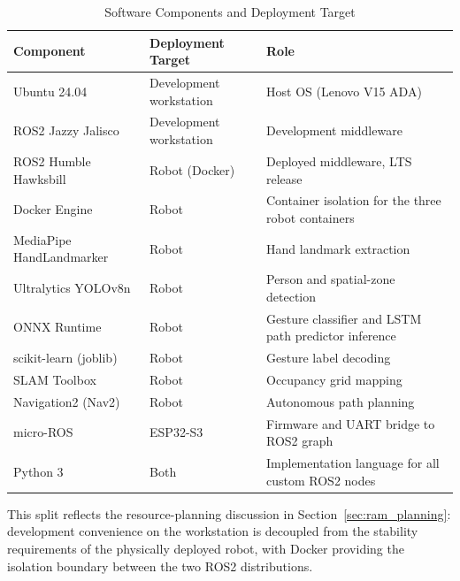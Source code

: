 \begin{table}[H]
\centering
\caption{Software Components and Deployment Target}
\label{tab:software_requirements}

\renewcommand{\arraystretch}{1.2}

\begin{tabular}{|p{3.2cm}|p{3cm}|p{7cm}|}
\hline
\textbf{Component} & \textbf{Deployment Target} & \textbf{Role} \\
\hline

Ubuntu 24.04 & Development workstation & Host OS (Lenovo V15 ADA) \\
\hline

ROS2 Jazzy Jalisco & Development workstation & Development middleware \\
\hline

ROS2 Humble Hawksbill & Robot (Docker) & Deployed middleware, LTS release \\
\hline

Docker Engine & Robot & Container isolation for the three robot containers \\
\hline

MediaPipe HandLandmarker & Robot & Hand landmark extraction \\
\hline

Ultralytics YOLOv8n & Robot & Person and spatial-zone detection \\
\hline

ONNX Runtime & Robot & Gesture classifier and LSTM path predictor inference \\
\hline

scikit-learn (joblib) & Robot & Gesture label decoding \\
\hline

SLAM Toolbox & Robot & Occupancy grid mapping \\
\hline

Navigation2 (Nav2) & Robot & Autonomous path planning \\
\hline

micro-ROS & ESP32-S3 & Firmware and UART bridge to ROS2 graph \\
\hline

Python 3 & Both & Implementation language for all custom ROS2 nodes \\
\hline

\end{tabular}
\end{table}

This split reflects the resource-planning discussion in Section~\ref{sec:ram_planning}: development
convenience on the workstation is decoupled from the stability requirements of the
physically deployed robot, with Docker providing the isolation boundary between the
two ROS2 distributions.


